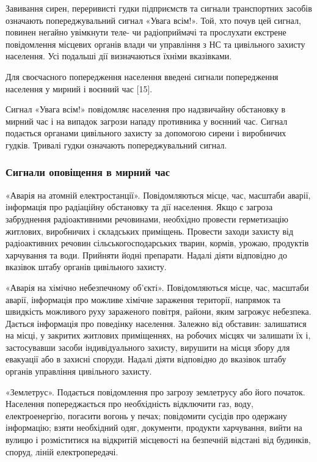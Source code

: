 Завивання сирен, переривисті гудки підприємств та сигнали транспортних засобів означають попереджувальний сигнал «Увага всім!». Той, хто почув цей сигнал, повинен негайно увімкнути теле- чи радіоприймачі та прослухати екстрене повідомлення місцевих органів влади чи управління з НС та цивільного захисту населення. Усі подальші дії визначаються їхніми вказівками.

Для своєчасного попередження населення введені сигнали попередження населення у мирний і воєнний час [15].

Сигнал «Увага всім!» повідомляє населення про надзвичайну обстановку в мирний час і на випадок загрози нападу противника у воєнний час. Сигнал подається органами цивільного захисту за допомогою сирени і виробничих гудків. Тривалі гудки означають попереджувальний сигнал.

\subsubsection{Сигнали оповіщення в мирний час}

«Аварія на атомній електростанції». Повідомляються місце, час, масштаби аварії, інформація про радіаційну обстановку та дії населення. Якщо є загроза забруднення радіоактивними речовинами, необхідно провести герметизацію житлових, виробничих і складських приміщень. Провести заходи захисту від радіоактивних речовин сільськогосподарських тварин, кормів, урожаю, продуктів харчування та води. Прийняти йодні препарати. Надалі діяти відповідно до вказівок штабу органів цивільного захисту.

«Аварія на хімічно небезпечному об'єкті». Повідомляються місце, час, масштаби аварії, інформація про можливе хімічне зараження території, напрямок та швидкість можливого руху зараженого повітря, райони, яким загрожує небезпека. Дається інформація про поведінку населення. Залежно від обставин: залишатися на місці, у закритих житлових приміщеннях, на робочих місцях чи залишати їх і, застосувавши засоби індивідуального захисту, вирушити на місця збору для евакуації або в захисні споруди. Надалі діяти відповідно до вказівок штабу органів управління цивільного захисту.

«Землетрус». Подається повідомлення про загрозу землетрусу або його початок. Населення попереджається про необхідність відключити газ, воду, електроенергію, погасити вогонь у печах; повідомити сусідів про одержану інформацію; взяти необхідний одяг, документи, продукти харчування, вийти на вулицю і розміститися на відкритій місцевості на безпечній відстані від будинків, споруд, ліній електропередачі.

